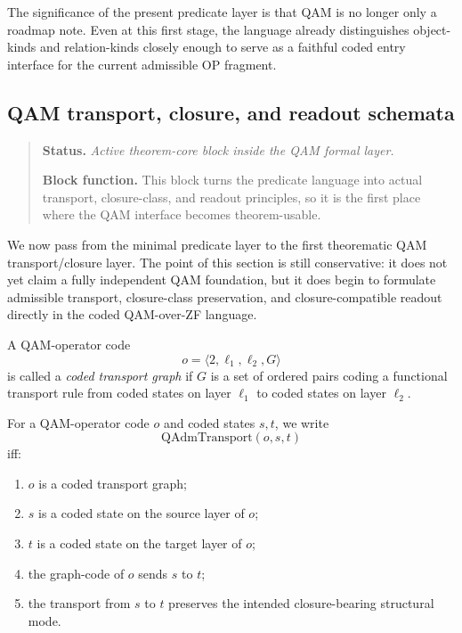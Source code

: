 \begin{remark}
The significance of the present predicate layer is that QAM is no longer only a roadmap note. Even at this first stage, the language already distinguishes object-kinds and relation-kinds closely enough to serve as a faithful coded entry interface for the current admissible OP fragment.
\end{remark}



\subsection*{QAM transport, closure, and readout schemata}
\begin{quote}\small
\noindent\textbf{Status.} \emph{Active theorem-core block inside the QAM formal layer.}\par
\noindent\textbf{Block function.} This block turns the predicate language into actual transport, closure-class, and readout principles, so it is the first place where the QAM interface becomes theorem-usable.
\end{quote}

We now pass from the minimal predicate layer to the first theorematic QAM transport/closure layer. The point of this section is still conservative: it does not yet claim a fully independent QAM foundation, but it does begin to formulate admissible transport, closure-class preservation, and closure-compatible readout directly in the coded QAM-over-ZF language.

\begin{definition}
A QAM-operator code
\[
o=\langle 2,\ell_1,\ell_2,G\rangle
\]
is called a \emph{coded transport graph} if $G$ is a set of ordered pairs coding a functional transport rule from coded states on layer $\ell_1$ to coded states on layer $\ell_2$.
\end{definition}

\begin{definition}
For a QAM-operator code $o$ and coded states $s,t$, we write
\[
\mathrm{QAdmTransport}(o,s,t)
\]
iff:
\begin{enumerate}
\item $o$ is a coded transport graph;
\item $s$ is a coded state on the source layer of $o$;
\item $t$ is a coded state on the target layer of $o$;
\item the graph-code of $o$ sends $s$ to $t$;
\item the transport from $s$ to $t$ preserves the intended closure-bearing structural mode.
\end{enumerate}
\end{definition}

